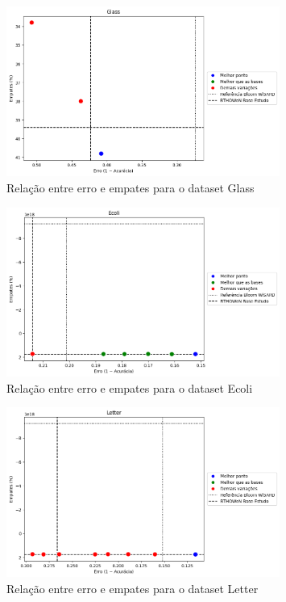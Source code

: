 \documentclass{article}
\begin{document}
\begin{figure}[H]
\centering
\includegraphics[width=0.8\textwidth]{figures/image5.png}
\caption{Relação entre erro e empates para o dataset Glass}
\label{fig:glass}
\end{figure}

\begin{figure}[H]
\centering
\includegraphics[width=0.8\textwidth]{figures/image6.png}
\caption{Relação entre erro e empates para o dataset Ecoli}
\label{fig:ecoli}
\end{figure}

\begin{figure}[H]
\centering
\includegraphics[width=0.8\textwidth]{figures/image12.png}
\caption{Relação entre erro e empates para o dataset Letter}
\label{fig:letter}
\end{figure}
\end{document}
